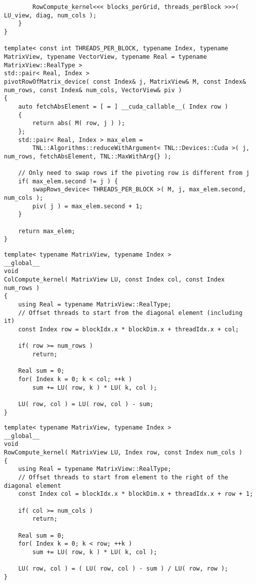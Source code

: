 \begin{lstlisting}
		RowCompute_kernel<<< blocks_perGrid, threads_perBlock >>>( LU_view, diag, num_cols );
	}
}

template< const int THREADS_PER_BLOCK, typename Index, typename MatrixView, typename VectorView, typename Real = typename MatrixView::RealType >
std::pair< Real, Index >
pivotRowOfMatrix_device( const Index& j, MatrixView& M, const Index& num_rows, const Index& num_cols, VectorView& piv )
{
	auto fetchAbsElement = [ = ] __cuda_callable__( Index row )
	{
		return abs( M( row, j ) );
	};
	std::pair< Real, Index > max_elem =
		TNL::Algorithms::reduceWithArgument< TNL::Devices::Cuda >( j, num_rows, fetchAbsElement, TNL::MaxWithArg{} );
	
	// Only need to swap rows if the pivoting row is different from j
	if( max_elem.second != j ) {
		swapRows_device< THREADS_PER_BLOCK >( M, j, max_elem.second, num_cols );
		piv( j ) = max_elem.second + 1;
	}
	
	return max_elem;
}
\end{lstlisting}

\begin{lstlisting}[caption={Implementation of the \code{ColCompute\_kernel()} kernel which computes one column of \code{LU}.},label={Listing:PCMxPP-implementation->kernels->column-compute-kernel}]
template< typename MatrixView, typename Index >
__global__
void
ColCompute_kernel( MatrixView LU, const Index col, const Index num_rows )
{
	using Real = typename MatrixView::RealType;
	// Offset threads to start from the diagonal element (including it)
	const Index row = blockIdx.x * blockDim.x + threadIdx.x + col;
	
	if( row >= num_rows )
		return;
	
	Real sum = 0;
	for( Index k = 0; k < col; ++k )
		sum += LU( row, k ) * LU( k, col );
	
	LU( row, col ) = LU( row, col ) - sum;
}
\end{lstlisting}

\begin{lstlisting}[caption={Implementation of the \code{RowCompute\_kernel()} kernel which computes one row of \code{LU}.},label={Listing:PCMxPP-implementation->kernels->row-compute-kernel}]
template< typename MatrixView, typename Index >
__global__
void
RowCompute_kernel( MatrixView LU, Index row, const Index num_cols )
{
	using Real = typename MatrixView::RealType;
	// Offset threads to start from element to the right of the diagonal element
	const Index col = blockIdx.x * blockDim.x + threadIdx.x + row + 1;
	
	if( col >= num_cols )
		return;
	
	Real sum = 0;
	for( Index k = 0; k < row; ++k )
		sum += LU( row, k ) * LU( k, col );
	
	LU( row, col ) = ( LU( row, col ) - sum ) / LU( row, row );
}
\end{lstlisting}





